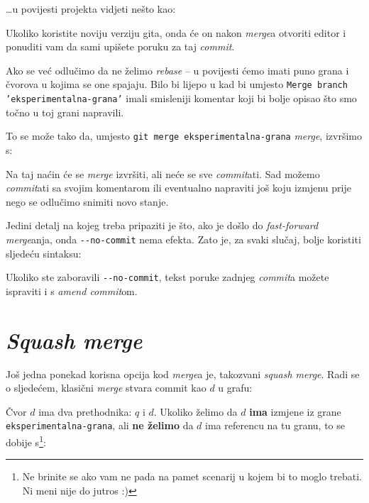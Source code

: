 

\dots{}u povijesti projekta vidjeti nešto kao:



Ukoliko koristite noviju verziju gita, onda će on nakon \emph{merge}a otvoriti editor i ponuditi vam da sami upišete poruku za taj \emph{commit}.

Ako se već odlučimo da ne želimo \emph{rebase} -- u povijesti ćemo imati puno grana i čvorova u kojima se one spajaju.
Bilo bi lijepo u kad bi umjesto \texttt{Merge branch 'eksperimentalna-grana'} imali smisleniji komentar koji bi bolje opisao što smo točno u toj grani napravili.

To se može tako da, umjesto \verb+git merge eksperimentalna-grana+ \emph{merge}, izvršimo s:


Na taj naćin će se \emph{merge} izvršiti, ali neće se sve \emph{commit}ati. 
Sad možemo \emph{commit}ati sa svojim komentarom ili eventualno napraviti još koju izmjenu prije nego se odlučimo snimiti novo stanje.

Jedini detalj na kojeg treba pripaziti je što, ako je došlo do \emph{fast-forward} \emph{merge}anja, onda \verb+--no-commit+ nema efekta.
Zato je, za svaki slučaj, bolje koristiti sljedeću sintaksu:


Ukoliko ste zaboravili \verb+--no-commit+, tekst poruke zadnjeg \emph{commit}a možete ispraviti i s \emph{amend commit}om.

\section*{\emph{Squash merge}}

Još jedna ponekad korisna opcija kod \emph{merge}a je, takozvani \emph{squash merge}.
Radi se o sljedećem, klasični \emph{merge} stvara commit kao $d$ u grafu:



Čvor $d$ ima dva prethodnika: $q$ i $d$.
Ukoliko želimo da $d$ \textbf{ima} izmjene iz grane \verb+eksperimentalna-grana+, ali \textbf{ne želimo} da $d$ ima referencu na tu granu, to se dobije s\footnote{Ne brinite se ako vam ne pada na pamet scenarij u kojem bi to moglo trebati. Ni meni nije do jutros :)}:

